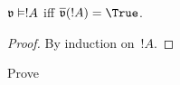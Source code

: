\documentclass[../../../include/open-logic-section]{subfiles}
\begin{document}
\begin{prop}
  $\pSat{v}{!A}$ iff $\pValue{v}(!A) = \True$.
\end{prop}

\begin{proof}
  By induction on~$!A$.
\end{proof}

\begin{prob}
  Prove 
\end{prob}
\end{document}

